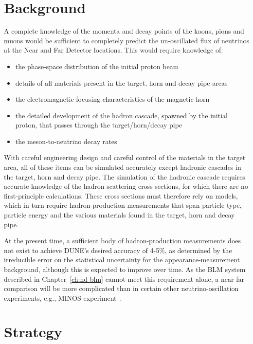 \section{Background}
A complete knowledge of the momenta and decay points of the kaons, pions and muons would be sufficient to completely predict the un-oscillated flux of neutrinos at the Near and Far Detector
locations. This would require knowledge of:

\begin{itemize}
\item the phase-space distribution of the initial proton beam
\item details of all materials present in the target, horn and decay pipe areas
\item  the electromagnetic focusing characteristics of the magnetic horn
\item the detailed development of the hadron cascade, spawned by the
initial proton, that passes through the target/horn/decay pipe
\item the meson-to-neutrino decay rates
\end{itemize}

With careful engineering design and careful control of the materials in the
target area, all of these items can be simulated accurately except
hadronic cascades in the target, horn and decay
pipe. The simulation of the hadronic cascade requires accurate knowledge of the 
hadron scattering cross sections, for which there are no first-principle
calculations. These cross sections must therefore rely on models, which in
turn require hadron-production measurements that span particle type,
particle energy and the various materials found in the target, horn
and decay pipe. 

 At the present time, a sufficient body of hadron-production
measurements does not exist to achieve DUNE's desired accuracy of 4-5\%, as determined by the irreducible 
error on the statistical uncertainty for the appearance-measurement background, although this is expected to improve over time. 
As the BLM system described in Chapter~\ref{ch:nd-blm} cannot meet this requirement alone, a near-far comparison will be more complicated than in certain other neutrino-oscillation experiments, e.g.,  MINOS experiment~\cite{gnumi-validation}. 

\section{Strategy}

